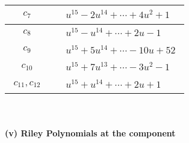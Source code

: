 \documentclass[1p]{elsarticle_modified}
\theoremstyle{definition}
\begin{document}
\begin{tabular}{m{50pt}|m{274pt}}
\hline $$\begin{aligned}c_{7}\end{aligned}$$&$\begin{aligned}
&u^{15}-2 u^{14}+\cdots+4 u^2+1
\end{aligned}$\\
\hline $$\begin{aligned}c_{8}\end{aligned}$$&$\begin{aligned}
&u^{15}- u^{14}+\cdots+2 u-1
\end{aligned}$\\
\hline $$\begin{aligned}c_{9}\end{aligned}$$&$\begin{aligned}
&u^{15}+5 u^{14}+\cdots-10 u+52
\end{aligned}$\\
\hline $$\begin{aligned}c_{10}\end{aligned}$$&$\begin{aligned}
&u^{15}+7 u^{13}+\cdots-3 u^2-1
\end{aligned}$\\
\hline $$\begin{aligned}c_{11},c_{12}\end{aligned}$$&$\begin{aligned}
&u^{15}+u^{14}+\cdots+2 u+1
\end{aligned}$\\
\hline
\end{tabular}\\~\\
\newpage\renewcommand{\arraystretch}{1}
\flushleft \textbf{(v) Riley Polynomials at the component}\newline \\
\end{document}
